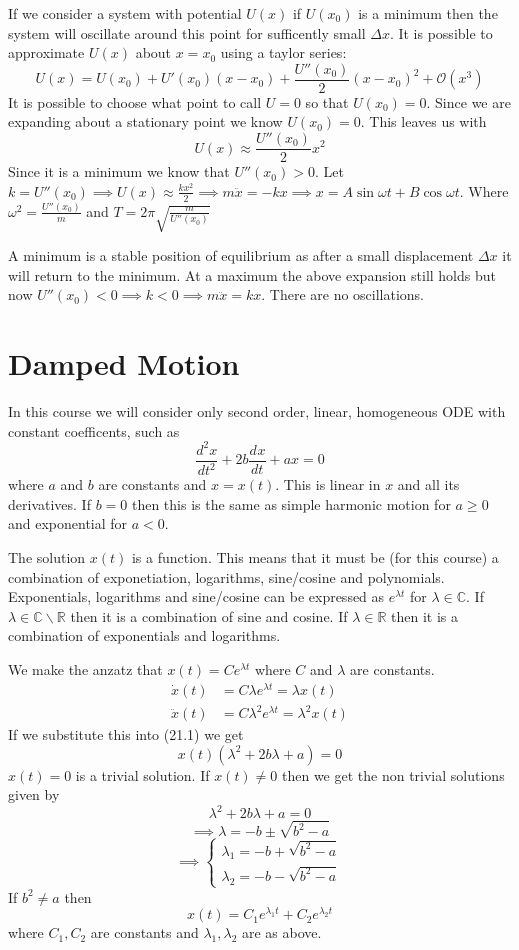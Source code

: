 \documentclass{article}
\newcommand{\bb}[1]{\mathbb{#1}}
\newcommand{\dv}[3][]{\frac{d^{#1}{#2}}{d{#3}^{#1}}}
\begin{document}
If we consider a system with potential \(U(x)\) if \(U(x_0)\) is a minimum then the system will oscillate around this point for sufficently small \(\Delta x\). It is possible to approximate \(U(x)\) about \(x=x_0\) using a taylor series:
\[U(x)=U(x_0)+U'(x_0)(x-x_0)+\frac{U''(x_0)}{2}(x-x_0)^2+\mathcal{O}(x^3)\]
It is possible to choose what point to call \(U=0\) so that \(U(x_0)=0\). Since we are expanding about a stationary point we know \(U(x_0)=0\). This leaves us with
\[U(x)\approx \frac{U''(x_0)}{2}x^2\]
Since it is a minimum we know that \(U''(x_0)>0\). Let \(k=U''(x_0)\implies U(x)\approx\frac{kx^2}{2}\implies m\ddot x=-kx\implies x=A\sin\omega t+B\cos\omega t\). Where \(\omega^2=\frac{U''(x_0)}{m}\) and \(T=2\pi\sqrt{\frac{m}{U''(x_0)}}\)

A minimum is a stable position of equilibrium as after a small displacement \(\Delta x\) it will return to the minimum. At a maximum the above expansion still holds but now \(U''(x_0)<0\implies k<0\implies m\ddot x=kx\). There are no oscillations.

\section{Damped Motion}

In this course we will consider only second order, linear, homogeneous ODE with constant coefficents, such as
\[\dv[2]{x}{t}+2b\dv xt + ax=0\tag{21.1}\]
where \(a\) and \(b\) are constants  and \(x=x(t)\). This is linear in \(x\) and all its derivatives. If \(b=0\) then this is the same as simple harmonic motion for \(a\ge 0\) and exponential for \(a<0\).

The solution \(x(t)\) is a function. This means that it must be (for this course) a combination of exponetiation, logarithms, sine/cosine and polynomials. Exponentials, logarithms and sine/cosine can be expressed as \(e^{\lambda t}\) for \(\lambda\in\bb C\). If \(\lambda\in\bb C\backslash\bb R\) then it is a combination of sine and cosine. If \(\lambda\in\bb R\) then it is a combination of exponentials and logarithms.

We make the anzatz that \(x(t)=Ce^{\lambda t}\) where \(C\) and \(\lambda\) are constants.
\begin{align*}
\dot x(t)&=C\lambda e^{\lambda t}=\lambda x(t)\\
\ddot x(t)&=C\lambda^2e^{\lambda t}=\lambda^2 x(t)
\end{align*}
If we substitute this into (21.1) we get
\[x(t)(\lambda^2+2b\lambda+a)=0\]
\(x(t)=0\) is a trivial solution. If \(x(t)\ne 0\) then we get the non trivial solutions given by
\[\lambda^2+2b\lambda+a=0\]
\[\implies \lambda=-b\pm\sqrt{b^2-a}\]
\[\implies\left\{
\begin{array}{c}
\lambda_1=-b+\sqrt{b^2-a}\\
\lambda_2=-b-\sqrt{b^2-a}
\end{array}
\right.\]
If \(b^2\ne a\) then
\[x(t)=C_1e^{\lambda_1t}+C_2e^{\lambda_2t}\]
where \(C_1,C_2\) are constants and \(\lambda_1,\lambda_2\) are as above.
\end{document}
